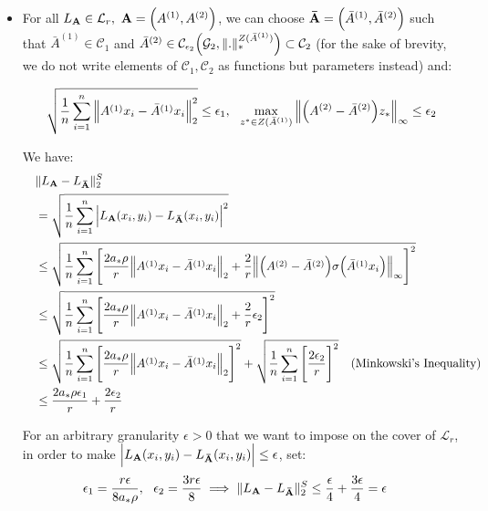 \begin{itemize}
    \item For all $L_\vecbf{A}\in\mathcal{L}_r, \ \vecbf{A}=\Big(A^{(1)}, A^{(2)}\Big)$, we can choose ${\bf \bar A}=\Big( \bar A^{(1)}, \bar A^{(2)} \Big)$ such that $\bar A^{(1)} \in \mathcal{C}_1$ and $\bar A^{(2)} \in \mathcal{C}_{\epsilon_2}\Big( \mathcal{G}_2, \|.\|_*^{Z(\bar A^{(1)})} \Big)\subset\mathcal{C}_2$ (for the sake of brevity, we do not write elements of $\mathcal{C}_1, \mathcal{C}_2$ as functions but parameters instead) and:

    \begin{align*}
        \sqrt{
            \frac{1}{n} \sum_{i=1}^n \Big\|
                A^{(1)}x_i - \bar A^{(1)}x_i
            \Big\|_2^2 
        } \le \epsilon_1, \ \
        \max_{z^* \in Z(\bar A^{(1)})} \Big\| \Big( A^{(2)} - \bar A^{(2)} \Big)z_* \Big\|_\infty \le \epsilon_2
    \end{align*}

    We have:
    \begin{align*}
        &\|L_{\bf A} - L_{\bf \bar A}\|_2^S \\
        \ \ \ &= 
        \sqrt{\frac{1}{n}\sum_{i=1}^n\Big| 
            L_{\bf A}(x_i, y_i) - L_{\bf \bar A}(x_i, y_i) 
         \Big|^2} \\
        &\le \sqrt{
            \frac{1}{n}\sum_{i=1}^n
            \Bigg[ 
                \frac{2a_*\rho}{r} \Big\|A^{(1)}x_i - \bar A^{(1)}x_i\Big\|_2 + \frac{2}{r}\Big\| \Big( 
                    A^{(2)} - \bar A^{(2)}
                 \Big)\sigma\Big( \bar A^{(1)}x_i \Big) \Big\|_\infty
             \Bigg]^2
        } \\
        &\le \sqrt{
            \frac{1}{n}\sum_{i=1}^n
            \Bigg[ 
                \frac{2a_*\rho}{r} \Big\|A^{(1)}x_i - \bar A^{(1)}x_i\Big\|_2 + \frac{2}{r}\epsilon_2
             \Bigg]^2
        } \\
        &\le \sqrt{
            \frac{1}{n}\sum_{i=1}^n \Bigg[ 
                \frac{2a_*\rho}{r} \Big\| 
                    A^{(1)}x_i - \bar A^{(1)}x_i
                \Big\|_2
             \Bigg]^2
        } + \sqrt{
            \frac{1}{n}\sum_{i=1}^n\Bigg[ 
                \frac{2\epsilon_2}{r}
             \Bigg]^2
        } \ \ \ \text{(Minkowski's Inequality)} \\
        &\le \frac{2a_*\rho\epsilon_1}{r} + \frac{2\epsilon_2}{r}
    \end{align*}

    \noindent For an arbitrary granularity $\epsilon>0$ that we want to impose on the cover of $\mathcal{L}_r$, in order to make $\Big| L_{\bf A}(x_i, y_i) - L_{\bf \bar A}(x_i, y_i) \Big| \le \epsilon$, set:
    \begin{align*}
        \epsilon_1 &= \frac{r\epsilon}{8a_*\rho}, \ \ \epsilon_2 = \frac{3r\epsilon}{8} \implies \|L_{\bf A} - L_{\bf \bar A}\|_2^S \le \frac{\epsilon}{4} + \frac{3\epsilon}{4} = \epsilon
    \end{align*}


\end{itemize}
